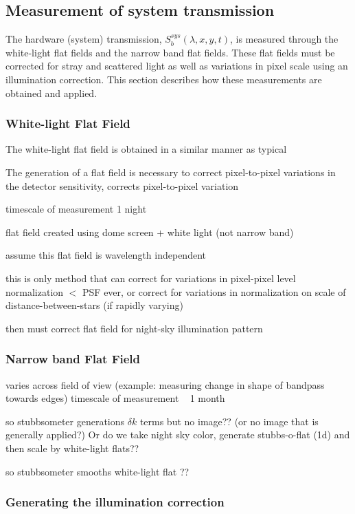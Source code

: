 \documentclass[12pt,preprint]{aastex}
\begin{document}
\subsection{Measurement of system transmission}

The hardware (system) transmission, $S_b^{sys}(\lambda,x,y,t)$, is
measured through the white-light flat fields and the narrow band flat
fields. These flat fields must be corrected for stray and scattered
light as well as variations in pixel scale using an illumination
correction. This section describes how these measurements are obtained
and applied.

\subsubsection{White-light Flat Field}

The white-light flat field is obtained in a similar manner as typical 

The generation of a flat field is necessary to correct pixel-to-pixel
variations in the detector sensitivity, 
corrects pixel-to-pixel variation

timescale of measurement 1 night

flat field created using dome screen + white light (not narrow band)

assume this flat field is wavelength independent

this is only method that can correct for variations in pixel-pixel
level normalization $<$ PSF ever, or correct for variations in
normalization on scale of distance-between-stars (if rapidly varying)

then must correct flat field for night-sky illumination pattern

\subsubsection{Narrow band Flat Field}
varies across field of view (example: measuring change in shape of
bandpass towards edges)
timescale of measurement ~ 1 month

so stubbsometer generations $\delta k$ terms but no image?? 
(or no image that is generally applied?)
Or do we take night sky color, generate stubbs-o-flat (1d) and then
scale by white-light flats??

so stubbsometer smooths white-light flat ??

\subsubsection{Generating the illumination correction}
\end{document}
